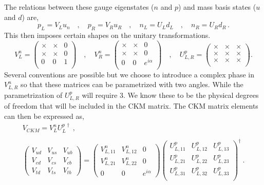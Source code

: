 \documentclass[10pt]{report}
\begin{document}
The relations between these gauge eigenstates ($n$ and $p$) and mass basis states ($u$ and $d$) are, 
\begin{equation}
\label{3HDM_states}
p_L = V_L u_n \quad , \quad p_R = V_R u_R \quad , \quad n_L = U_L d_L \quad , \quad n_R = U_R d_R \, .
\end{equation}
This then imposes certain shapes on the unitary transformations. 
\begin{equation}
V^{n}_{L} = \begin{pmatrix}
\times & \times & 0 \\ 
\times & \times & 0 \\
0 & 0 & 1 \\ 
\end{pmatrix} \quad , \quad   V^{n}_{R} = \begin{pmatrix}
\times & \times & 0 \\ 
\times & \times & 0 \\
0 & 0 & e^{i\alpha}  \\ 
\end{pmatrix}  \quad , \quad 
U^{p}_{L,R} = 
\begin{pmatrix}
\times & \times & \times \\ 
\times & \times & \times \\
\times & \times & \times \\
\end{pmatrix} .
\end{equation}
Several conventions are possible but we choose to  introduce a complex phase in $V^n_{L,R}$ so that these matrices can be parametrized with two angles. While the parametrization of $U^p_{L,R}$ will require 3. We know these to be the physical degrees of freedom that will be included in the CKM matrix. The CKM matrix elements can then be expressed as, 
\begin{equation}
\begin{gathered}
V_{CKM} = V_L^n U_L^{p\, \dagger}  \ , \\ 
\\
\begin{pmatrix}
V_{ud} & V_{us} & V_{ub} \\
V_{cd} & V_{cs} & V_{cb} \\ 
V_{td} & V_{ts} & V_{tb} 
\end{pmatrix}  = \begin{pmatrix}
V_{L,11}^n & V_{L,12}^n & 0 \\ 
V_{L,21}^n & V_{L,22}^n & 0 \\ 
0 & 0 & e^{i \alpha} 
\end{pmatrix} \begin{pmatrix}
U_{L,11}^p & U_{L,12}^p & U_{L,13}^p \\
U_{L,21}^p & U_{L,22}^p & U_{L,23}^p \\
U_{L,31}^p & U_{L,32}^p & U_{L,33}^p \\
\end{pmatrix} ^\dagger \ .
\end{gathered} 
\end{equation}
\end{document}

